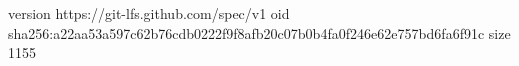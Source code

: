 version https://git-lfs.github.com/spec/v1
oid sha256:a22aa53a597c62b76cdb0222f9f8afb20c07b0b4fa0f246e62e757bd6fa6f91c
size 1155
